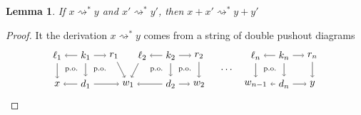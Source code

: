 \documentclass{amsart}
\newcommand{\deriv}[2]{#1 \rightsquigarrow^\ast #2}
\newtheorem{lemma}[theorem]{Lemma}
\theoremstyle{remark}
\theoremstyle{definition}
\begin{document}
\begin{lemma}
\label{thm:rewrite-rel-is-additive}
  If $ \deriv{x}{y} $ and $ \deriv{x'}{y'} $, then $ \deriv{x+x'}{y+y'} $
\end{lemma}

\begin{proof}
  It the derivation $ \deriv{x}{y} $ comes from a string of double
  pushout diagrams
  \[
    \begin{tikzpicture}
      \node (1t) at (0,1) {$ \ell_1 $};
      \node (2t) at (1,1) {$ k_1 $};
      \node (3t) at (2,1) {$ r_1 $};
      \node (4t) at (3,1) {$ \ell_2 $};
      \node (5t) at (4,1) {$ k_2 $};
      \node (6t) at (5,1) {$ r_2 $};
      \node (7t) at (7,1) {$ \ell_n $};
      \node (8t) at (8,1) {$ k_n $};
      \node (9t) at (9,1) {$ r_n $};
      \node (1b) at (0,0) {$ x $};
      \node (2b) at (1,0) {$ d_1 $};
      \node (3b) at (2.5,0) {$ w_1 $};
      \node (4b) at (4,0) {$ d_2 $};
      \node (5b) at (5,0) {$ w_2 $};
      \node (6b) at (7,0) {$ w_{n-1} $};
      \node (7b) at (8,0) {$ d_n $};
      \node (8b) at (9,0) {$ y $};
      \draw [->] (2t) to node [] {\scriptsize{$  $}} (1t);
      \draw [->] (2t) to node [] {\scriptsize{$  $}} (3t);
      \draw [->] (5t) to node [] {\scriptsize{$  $}} (4t);
      \draw [->] (5t) to node [] {\scriptsize{$  $}} (6t);
      \draw [->] (8t) to node [] {\scriptsize{$  $}} (7t);
      \draw [->] (8t) to node [] {\scriptsize{$  $}} (9t);
      \draw [->] (2b) to node [] {\scriptsize{$  $}} (1b);
      \draw [->] (2b) to node [] {\scriptsize{$  $}} (3b);
      \draw [->] (4b) to node [] {\scriptsize{$  $}} (3b);
      \draw [->] (4b) to node [] {\scriptsize{$  $}} (5b);
      \draw [->] (7b) to node [] {\scriptsize{$  $}} (6b);
      \draw [->] (7b) to node [] {\scriptsize{$  $}} (8b);
      \draw [->] (1t) to node [] {\scriptsize{$  $}} (1b);
      \draw [->] (2t) to node [] {\scriptsize{$  $}} (2b);
      \draw [->] (3t) to node [] {\scriptsize{$  $}} (3b);
      \draw [->] (4t) to node [] {\scriptsize{$  $}} (3b);
      \draw [->] (5t) to node [] {\scriptsize{$  $}} (4b);
      \draw [->] (6t) to node [] {\scriptsize{$  $}} (5b);
      \draw [->] (7t) to node [] {\scriptsize{$  $}} (6b);
      \draw [->] (8t) to node [] {\scriptsize{$  $}} (7b);
      \draw [->] (9t) to node [] {\scriptsize{$  $}} (8b);
      \node () at (6,0.5) {$ \dotsm $};
      \node () at (0.5,0.5) {\scriptsize{p.o.}};
      \node () at (1.5,0.5) {\scriptsize{p.o.}};
      \node () at (3.5,0.5) {\scriptsize{p.o.}};
      \node () at (4.5,0.5) {\scriptsize{p.o.}};
      \node () at (7.5,0.5) {\scriptsize{p.o.}};

\end{tikzpicture}\]
\end{proof}
\end{document}
